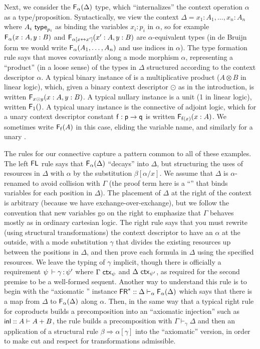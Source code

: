 \documentclass[a4paper,USenglish,numberwithinsect]{lipics-v2016}
\newcommand\spr{\ensuremath{\Rightarrow}} %
\newcommand\seq[3]{\ensuremath{#1 \vdash_{#2} #3}}
\newcommand\F[2]{\ensuremath{\dsd{F}_{#1}(#2)}}
\renewcommand\subst[3]{\ensuremath{#1[#2/#3]}}
\newcommand\wftype[2]{\ensuremath{#1 \,\, \dsd{type}_{#2}}}
\renewcommand\wfctx[2]{\ensuremath{#1 \,\, \dsd{ctx}_{#2}}}
\renewcommand{\oftp}[3]{\ensuremath{#1 \, \vdash #2 \, \dcd{:} \, #3}}
\newcommand\FL{\dsd{FL}}
\newcommand\FR{\dsd{FR}}
\begin{document}
Next, we consider the \F{\alpha}{\Delta} type, which ``internalizes''
the context operation $\alpha$ as a type/proposition.  Syntactically, we
view the context $\Delta = x_1:A_1,\ldots,x_n:A_n$ where
\wftype{A_i}{p_i} as binding the variables $x_i:p_i$ in $\alpha$, so for
example \F{\alpha}{x:A,y:B} and \F{\alpha[x \leftrightarrow
    x']}{x':A,y:B} are $\alpha$-equivalent types (in de Bruijn form we
would write \F{\alpha}{A_1,\ldots,A_n} and use indices in $\alpha$).
The type formation rule says that  moves covariantly along a mode
morphism $\alpha$, representing a ``product'' (in a loose sense) of the
types in $\Delta$ structured according to the context descriptor
$\alpha$. A typical binary instance of  is a multiplicative
product ($A \otimes B$ in linear logic), which, given a binary context
descriptor $\odot$ as in the introduction, is written \F{x \odot
  y}{x:A,y:B}.  A typical nullary instance is a unit (1 in linear
logic), written \F{1}{}.  A typical unary instance is the 
connective of adjoint logic, which for a unary context descriptor
constant $\mathsf{f} : \mathsf{p} \to \mathsf{q}$ is written \F{\dsd{f}(x)}{x:A}.
We sometimes write \F{\dsd{f}}{A} in this case, eliding the variable
name, and similarly for a unary .

The rules for our  connective capture a pattern common to all of
these examples.  The left $\FL$ rule says that \F{\alpha}{\Delta}
``decays'' into $\Delta$, but structuring the uses of resources in
  $\Delta$ with $\alpha$ by the substitution \subst{\beta}{\alpha}{x}.
We assume that $\Delta$ is $\alpha$-renamed to avoid collision with
$\Gamma$ (the proof term here is a ``'' that binds
variables for each position in $\Delta$).  The placement of $\Delta$ at
the right of the context is arbitrary (because we have
exchange-over-exchange), but we follow the convention that new variables
go on the right to emphasize that $\Gamma$ behaves mostly as in ordinary
cartesian logic.  The right \FR\/ rule says that you must rewrite (using
structural transformations) the context descriptor to have an $\alpha$
at the outside, with a mode substitution $\gamma$ that divides the
existing resources up between the positions in $\Delta$, and then prove
each formula in $\Delta$ using the specified resources.  We leave the
typing of $\gamma$ implicit, though there is officially a requirement
$\oftp{\psi}{\gamma}{\psi'}$ where $\wfctx{\Gamma}{\psi}$ and
$\wfctx{\Delta}{\psi'}$, as required for the second premise to be a
well-formed sequent.  Another way to understand this rule is to begin
with the ``axiomatic \FR'' instance 
$\FR^* :: {\seq{\Delta}{\alpha}{\F{\alpha}{\Delta}}}{}$
which says that there is a map from $\Delta$ to \F{\alpha}{\Delta} along
$\alpha$.  Then, in the same way that a typical right rule for
coproducts builds a precomposition into an ``axiomatic injection'' such
as $\mathsf{inl} :: A \vdash A + B$, the \FR\/ rule builds a precomposition
with $\seq{\Gamma}{\gamma}{\Delta}$ and then an application of a
structural rule $\beta \spr \alpha[\gamma]$ into the ``axiomatic''
version, in order to make cut and respect for transformations
admissible.
\end{document}
